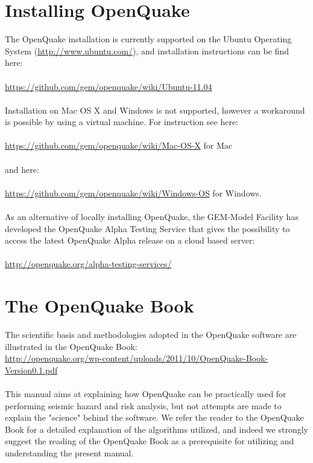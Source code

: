 \section{Installing OpenQuake}
The OpenQuake installation is currently supported on the Ubuntu Operating System (\href{http://www.ubuntu.com/}
   {http://www.ubuntu.com/}), and installation instructions can be find here:\\ \\
    \href{https://github.com/gem/openquake/wiki/Ubuntu-11.04}
   {https://github.com/gem/openquake/wiki/Ubuntu-11.04}\\ \\
Installation on Mac OS X and Windows is not supported, however a workaround is possible by using a virtual machine. For instruction see here:\\ \\
\href{https://github.com/gem/openquake/wiki/Mac-OS-X}
   {https://github.com/gem/openquake/wiki/Mac-OS-X}   for Mac\\ \\
   and here:\\ \\
   \href{https://github.com/gem/openquake/wiki/Windows-OS}
   {https://github.com/gem/openquake/wiki/Windows-OS} for Windows.\\ \\
As an alternative of locally installing OpenQuake, the GEM-Model Facility has developed the OpenQuake Alpha Testing Service that gives the possibility to access the latest OpenQuake Alpha release on a cloud based server:\\ \\
\href{http://openquake.org/alpha-testing-services/}
   {http://openquake.org/alpha-testing-services/}

\section{The OpenQuake Book}
The scientific basis and methodologies adopted in the OpenQuake software are illustrated in the OpenQuake Book:\\
\href{http://openquake.org/wp-content/uploads/2011/10/OpenQuake-Book_Version0.1.pdf}
   {http://openquake.org/wp-content/uploads/2011/10/OpenQuake-Book-Version0.1.pdf}\\ \\
This manual aims at explaining how OpenQuake can be practically used for performing seismic hazard and risk analysis, but not attempts are made to explain the "science" behind the software. We refer the reader to the OpenQuake Book for a detailed explanation of the algorithms utilized, and indeed we strongly suggest the reading of the OpenQuake Book as a prerequisite for utilizing and understanding the present manual.

